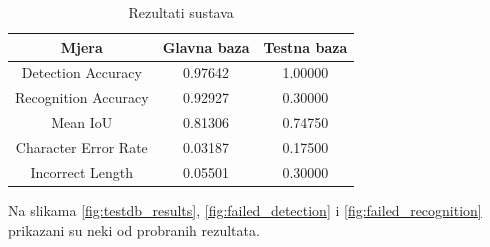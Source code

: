 \documentclass[times, utf8, diplomski]{fer}
\begin{document}
\begin{table}[H]
    \centering
    \begin{tabular}{|c|c|c|}
        \hline
        Mjera & Glavna baza & Testna baza \\
        \hline \hline
        Detection Accuracy & 0.97642 & 1.00000 \\
        \hline
        Recognition Accuracy & 0.92927 & 0.30000 \\
        \hline
        Mean IoU & 0.81306 & 0.74750 \\
        \hline
        Character Error Rate & 0.03187 & 0.17500 \\
        \hline
        Incorrect Length & 0.05501 & 0.30000 \\
        \hline
    \end{tabular}
    \caption{Rezultati sustava}
    \label{tab:results}
\end{table}

Na slikama \ref{fig:testdb_results}, \ref{fig:failed_detection} i \ref{fig:failed_recognition} prikazani su neki od probranih rezultata.
\end{document}

